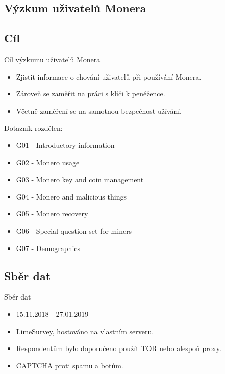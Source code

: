 \documentclass{beamer}
\begin{document}
    
   
  \begin{darkframes}
    \section{Výzkum uživatelů Monera}
    \subsection{Cíl}
    \begin{frame}{Cíl výzkumu uživatelů Monera}
\begin{itemize}
\item Zjistit informace o chování uživatelů při používání Monera. 
\item Zároveň se zaměřit na práci s klíči k peněžence. 
\item Včetně zaměření se na samotnou bezpečnost užívání.
\end{itemize}


\vspace{1em}
Dotazník rozdělen:
\begin{itemize}
\item<1-4> G01 - Introductory information
\item<1-4> G02 - Monero usage
\item<2-4> G03 - Monero key and coin management
\item<3-4> G04 - Monero and malicious things
\item<4-4> G05 - Monero recovery
\item<4-4> G06 - Special question set for miners
\item<4-4> G07 - Demographics
	\end{itemize}
	\end{frame}
    \subsection{Sběr dat}
    \begin{frame}{Sběr dat}
     \begin{itemize}
     \item 15.11.2018 - 27.01.2019
     \item LimeSurvey, hostováno na vlastním serveru.
     \item Respondentům bylo doporučeno použít TOR nebo alespoň proxy.
     \item CAPTCHA proti spamu a botům.
     \end{itemize}
    \end{frame}

\end{darkframes}
\end{document}
